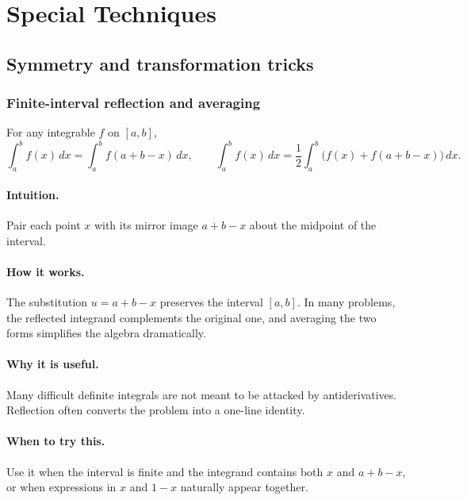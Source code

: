 \documentclass[12pt]{article}
\begin{document}


\newpage

\newpage

\newpage

\newpage

\newpage


\appendix
\section{Special Techniques}

\subsection{Symmetry and transformation tricks}
\subsubsection{Finite-interval reflection and averaging}
For any integrable \(f\) on \([a,b]\),
\[
\int_a^b f(x)\,dx=\int_a^b f(a+b-x)\,dx,
\qquad
\int_a^b f(x)\,dx=\frac12\int_a^b\!\bigl(f(x)+f(a+b-x)\bigr)\,dx.
\]

\paragraph{Intuition.}
Pair each point \(x\) with its mirror image \(a+b-x\) about the midpoint of the interval.

\paragraph{How it works.}
The substitution \(u=a+b-x\) preserves the interval \([a,b]\). In many problems, the reflected integrand complements the original one, and averaging the two forms simplifies the algebra dramatically.

\paragraph{Why it is useful.}
Many difficult definite integrals are not meant to be attacked by antiderivatives. Reflection often converts the problem into a one-line identity.

\paragraph{When to try this.}
Use it when the interval is finite and the integrand contains both \(x\) and \(a+b-x\), or when expressions in \(x\) and \(1-x\) naturally appear together.
\end{document}
